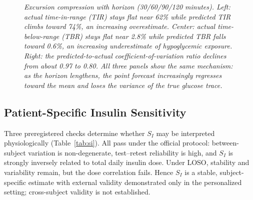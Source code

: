 \documentclass[journal]{IEEEtran}
\begin{document}
\begin{figure}[t]
\centering
{}
\caption{\small\textit{Excursion compression with horizon (30/60/90/120 minutes). Left: actual time-in-range (TIR) stays flat near 62\% while predicted TIR climbs toward 74\%, an increasing overestimate. Center: actual time-below-range (TBR) stays flat near 2.8\% while predicted TBR falls toward 0.6\%, an increasing underestimate of hypoglycemic exposure. Right: the predicted-to-actual coefficient-of-variation ratio declines from about 0.97 to 0.80. All three panels show the same mechanism: as the horizon lengthens, the point forecast increasingly regresses toward the mean and loses the variance of the true glucose trace.}}
\label{fig:excursion}
\end{figure}

\subsection{Patient-Specific Insulin Sensitivity}

Three preregistered checks determine whether $S_I$ may be interpreted physiologically (Table~\ref{tab:si}). All pass under the official protocol: between-subject variation is non-degenerate, test--retest reliability is high, and $S_I$ is strongly inversely related to total daily insulin dose. Under LOSO, stability and variability remain, but the dose correlation fails. Hence $S_I$ is a stable, subject-specific estimate with external validity demonstrated only in the personalized setting; cross-subject validity is not established.
\end{document}
